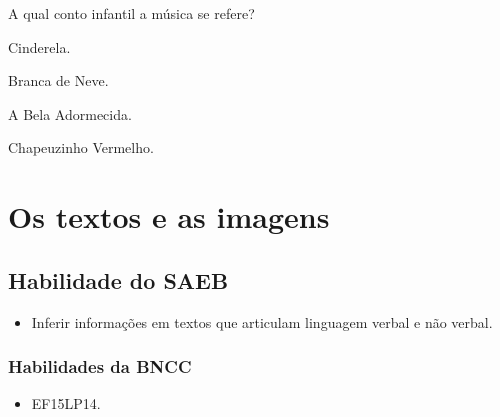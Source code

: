 A qual conto infantil a música se refere?

\begin{escolha}
\item Cinderela.

\item Branca de Neve.

\item A Bela Adormecida.

\item Chapeuzinho Vermelho.
\end{escolha}


\chapter{Os textos e as imagens}

\section*{Habilidade do SAEB}

\begin{itemize}
\item
Inferir informações em textos que articulam linguagem verbal e não verbal.
\end{itemize}

\subsection{Habilidades da BNCC}

\begin{itemize}
\item EF15LP14.
\end{itemize}


